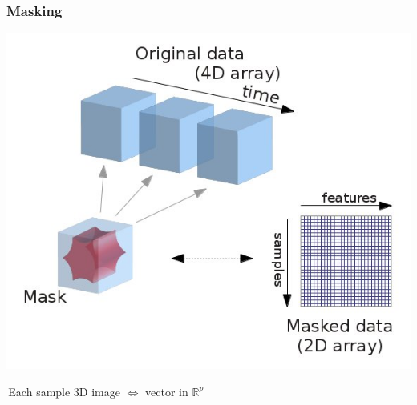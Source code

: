 \documentclass{beamer}
\def\mydot{\structure{\rule{1ex}{1ex}}\,}
\begin{document}
\begin{frame}\frametitle{Masking}
  \centering
  \includegraphics[width=.7\linewidth]{masking.jpg}

\mydot Each sample 3D image $\iff$ vector in $\mathbb R^p$%
  
\end{frame}
\end{document}
